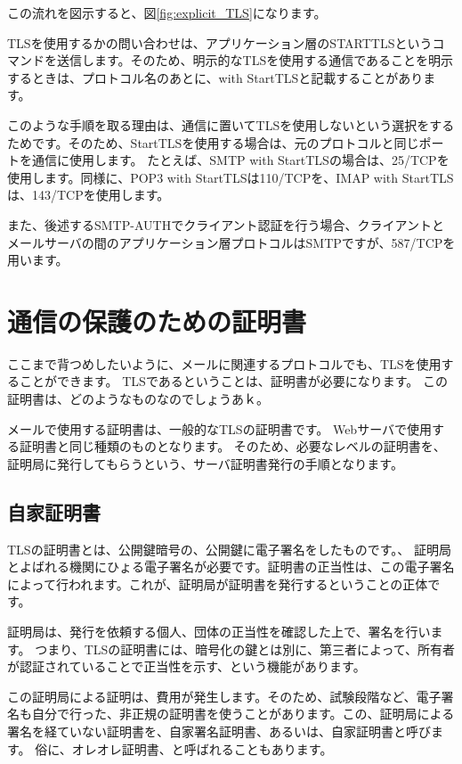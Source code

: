 この流れを図示すると、図\ref{fig:explicit_TLS}になります。

TLSを使用するかの問い合わせは、アプリケーション層のSTARTTLSというコマンドを送信します。そのため、明示的なTLSを使用する通信であることを明示するときは、プロトコル名のあとに、with StartTLSと記載することがあります。

このような手順を取る理由は、通信に置いてTLSを使用しないという選択をするためです。そのため、StartTLSを使用する場合は、元のプロトコルと同じポートを通信に使用します。
たとえば、SMTP with StartTLSの場合は、25/TCPを使用します。同様に、POP3 with StartTLSは110/TCPを、IMAP with StartTLSは、143/TCPを使用します。

また、後述するSMTP-AUTHでクライアント認証を行う場合、クライアントとメールサーバの間のアプリケーション層プロトコルはSMTPですが、587/TCPを用います。

\section{通信の保護のための証明書}

ここまで背つめしたいように、メールに関連するプロトコルでも、TLSを使用することができます。
TLSであるということは、証明書が必要になります。
この証明書は、どのようなものなのでしょうあｋ。

メールで使用する証明書は、一般的なTLSの証明書です。
Webサーバで使用する証明書と同じ種類のものとなります。
そのため、必要なレベルの証明書を、証明局に発行してもらうという、サーバ証明書発行の手順となります。

\subsection{自家証明書}

TLSの証明書とは、公開鍵暗号の、公開鍵に電子署名をしたものです。、
証明局とよばれる機関にひょる電子署名が必要です。証明書の正当性は、この電子署名によって行われます。これが、証明局が証明書を発行するということの正体です。

証明局は、発行を依頼する個人、団体の正当性を確認した上で、署名を行います。
つまり、TLSの証明書には、暗号化の鍵とは別に、第三者によって、所有者が認証されていることで正当性を示す、という機能があります。

この証明局による証明は、費用が発生します。そのため、試験段階など、電子署名も自分で行った、非正規の証明書を使うことがあります。この、証明局による署名を経ていない証明書を、自家署名証明書、あるいは、自家証明書と呼びます。
俗に、オレオレ証明書、と呼ばれることもあります。

